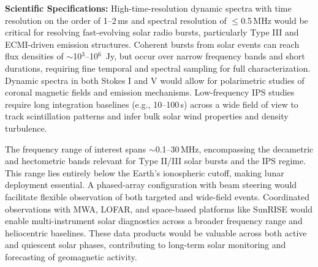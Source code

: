 
\textbf{Scientific Specifications:} High-time-resolution dynamic spectra with time resolution on the order of 1--2\,ms and spectral resolution of $\leq$0.5\,MHz would be critical for resolving fast-evolving solar radio bursts, particularly Type III and ECMI-driven emission structures. Coherent bursts from solar events can reach flux densities of $\sim$10$^3$--10$^6$~Jy, but occur over narrow frequency bands and short durations, requiring fine temporal and spectral sampling for full characterization. Dynamic spectra in both Stokes I and V would allow for polarimetric studies of coronal magnetic fields and emission mechanisms. Low-frequency IPS studies require long integration baselines (e.g., 10--100\,s) across a wide field of view to track scintillation patterns and infer bulk solar wind properties and density turbulence. \

The frequency range of interest spans $\sim$0.1--30\,MHz, encompassing the decametric and hectometric bands relevant for Type II/III solar bursts and the IPS regime. This range lies entirely below the Earth's ionospheric cutoff, making lunar deployment essential. A phased-array configuration with beam steering would facilitate flexible observation of both targeted and wide-field events. Coordinated observations with MWA, LOFAR, and space-based platforms like SunRISE would enable multi-instrument solar diagnostics across a broader frequency range and heliocentric baselines. These data products would be valuable across both active and quiescent solar phases, contributing to long-term solar monitoring and forecasting of geomagnetic activity.


